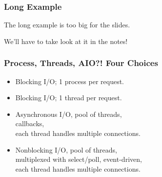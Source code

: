 \begin{frame}
\frametitle{Long Example}

The long example is too big for the slides. 

We'll have to take look at it in the notes!


\end{frame}


\begin{frame}
  \frametitle{Process, Threads, AIO?! Four Choices}

  
    \begin{itemize}
      \item Blocking I/O; 1 process per request.
      \item Blocking I/O; 1 thread per request.
      \item Asynchronous I/O, pool of threads, \\callbacks, \\ each thread handles multiple connections.
      \item Nonblocking I/O, pool of threads, \\ multiplexed with select/poll,
        event-driven, \\ each thread handles multiple connections.
    \end{itemize}
  

\end{frame}

